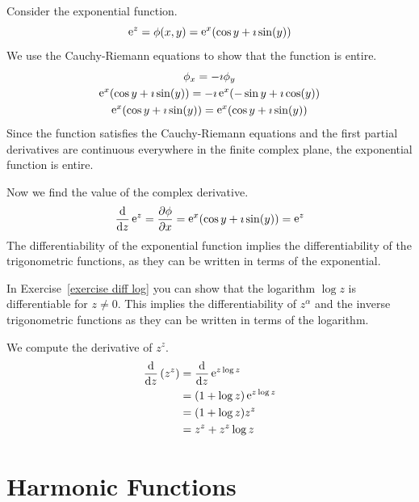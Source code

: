 \begin{Example}
  Consider the exponential function.
  \[
  \mathop{\mathrm{e}}\nolimits^z = \phi(x,y) = \mathop{\mathrm{e}}\nolimits^x (\cos y + \imath \sin(y))
  \]
  We use the Cauchy-Riemann equations to show that the function is entire.
  \begin{gather*}
    \phi_x = - \imath \phi_y
    \\
    \mathop{\mathrm{e}}\nolimits^x (\cos y + \imath \sin(y)) = - \imath \mathop{\mathrm{e}}\nolimits^x (- \sin y + \imath \cos(y)) 
    \\
    \mathop{\mathrm{e}}\nolimits^x (\cos y + \imath \sin(y)) = \mathop{\mathrm{e}}\nolimits^x (\cos y + \imath \sin(y)) 
  \end{gather*}
  Since the function satisfies the Cauchy-Riemann equations and the first
  partial derivatives are continuous everywhere in the finite complex plane,
  the exponential function is entire.

  Now we find the value of the complex derivative.
  \[
  \frac{\mathrm{d}}{\mathrm{d} z} \mathop{\mathrm{e}}\nolimits^z = \frac{\partial \phi}{\partial x} = \mathop{\mathrm{e}}\nolimits^x (\cos y + \imath \sin(y)) = \mathop{\mathrm{e}}\nolimits^z
  \]
  The differentiability of the exponential function implies the 
  differentiability of the trigonometric functions, as they can be written
  in terms of the exponential.
\end{Example}




In Exercise~\ref{exercise diff log} you can show that the logarithm $\log z$
is differentiable for $z \neq 0$.  This implies the differentiability of
$z^\alpha$ and the inverse trigonometric functions as they can be written in terms
of the logarithm.




\begin{Example}
  We compute the derivative of $z^z$.
  \begin{align*}
    \frac{\mathrm{d}}{\mathrm{d} z} \left( z^z \right)
    &= \frac{\mathrm{d}}{\mathrm{d} z} \mathop{\mathrm{e}}\nolimits^{z \log z} 
    \\
    &= (1 + \log z) \mathop{\mathrm{e}}\nolimits^{z \log z } 
    \\
    &= (1 + \log z) z^z 
    \\
    &= z^z + z^z \log z
  \end{align*}
\end{Example}








\section{Harmonic Functions}

